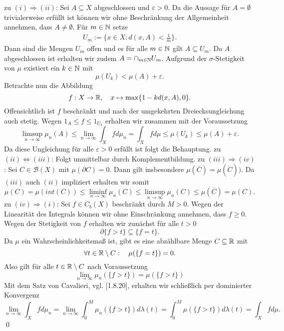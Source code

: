 \begin{proof*}
    zu $(i) \Rightarrow (ii)$: Sei $A \subseteq X$ abgeschlossen und $\varepsilon > 0$. Da die Aussage für $A = \emptyset$ trivialerweise erfüllt ist
    können wir ohne Beschränkung der Allgemeinheit annehmen, dass $A \neq \emptyset$. Für $m \in \mathbb{N}$ setze
    \begin{align*}
        U_m := \{x \in X: d(x,A) < \frac{1}{m}\}.
    \end{align*}
    Dann sind die Mengen $U_m$ offen und es für alle $m \in \mathbb{N}$ gilt $A \subseteq U_m$. Da $A$ abgeschlossen ist erhalten wir zudem $ A = \cap_{m \in \mathbb{N}} U_m$. 
    Aufgrund der $\sigma$-Stetigkeit von $\mu$ existiert ein $k \in \mathbb{N}$ mit 
    $$
        \mu(U_k) < \mu(A) + \varepsilon . 
    $$
    Betrachte nun die Abbildung 
    $$
        f:X \to \mathbb{R}, \quad x \mapsto \max\{1 - kd(x,A), 0\}.
    $$
    Offensichtlich ist $f$ beschränkt und nach der umgekehrten Dreiecksungleichung auch stetig. Wegen $1_A \leq f \leq 1_{U_k}$ erhalten wir zusammen mit der Voraussetzung 
    $$
    \limsup_{n \to \infty} \mu_n(A) \leq \lim_{n \to \infty} \int_X fd\mu_n = \int_X fd\mu \leq \mu(U_k) \leq \mu(A) + \varepsilon.
    $$
    Da diese Ungleichung für alle $\varepsilon > 0$ erfüllt ist folgt die Behauptung. 
    \newline 
    zu $(ii) \iff (iii)$: Folgt unmittelbar durch Komplementbildung. 
    \newline
    zu $(iii) \Rightarrow (iv)$: 
    Sei $C \in \mathcal{B}(X)$ mit $\mu(\partial C) = 0$. Dann gilt insbesondere $\mu(\overline{C}) = \mu(\mathring{C}))$. Da $(iii)$ auch $(ii)$ impliziert erhalten wir somit
    $$
        \mu(C) = \mu(int(C)) \leq \liminf_{n \to \infty} \mu_n(C) \leq \limsup_{n \to \infty} \mu_n(C) \leq \mu(\overline{C}) = \mu(C).
    $$
    \newline 
    zu $(iv) \Rightarrow (i)$: 
    Sei $f \in C_b(X)$ beschränkt durch $M > 0$. Wegen der Linearität des Integrals können wir ohne Einschränkung annehmen, dass $f \geq 0$. 
    Wegen der Stetigkeit von $f$ erhalten wir zunächst für alle $t > 0$
    $$
        \partial\{ f > t \} \subseteq \{f = t \}. 
    $$
    Da $\mu$ ein Wahrscheinlichkeitsmaß ist, gibt es eine abzählbare Menge $C \subseteq \mathbb{R}$ mit 
    $$
        \forall t \in \mathbb{R} \setminus C: \quad \mu(\{f = t \}) = 0. 
    $$
    Also gilt für alle $t \in \mathbb{R} \setminus C$ nach Voraussetzung 
    $$
        \lim_{n \to \infty} \mu_n(\{f > t \}) = \mu(\{f > t \})
    $$
    Mit dem Satz von Cavalieri, vgl. \cite{gs}[1.8.20], erhalten wir schließlich per dominierter Konvergenz
    $$
        \lim_{n \to \infty} \int_X fd\mu_n = \lim_{n \to \infty} \int_0^M \mu_n(\{f > t \})d\lambda(t) = \int_0^M \mu(\{f > t \}) d\lambda(t) = \int_Xfd\mu. 
    $$
    \qed 
\end{proof*}